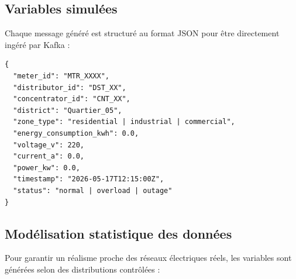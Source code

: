 \documentclass[1pt,a4paper]{report}
\begin{document}
\subsection{Variables simulées}
Chaque message généré est structuré au format JSON pour être directement ingéré par Kafka :

\begin{verbatim}
{
  "meter_id": "MTR_XXXX",
  "distributor_id": "DST_XX",
  "concentrator_id": "CNT_XX",
  "district": "Quartier_05",
  "zone_type": "residential | industrial | commercial",
  "energy_consumption_kwh": 0.0,
  "voltage_v": 220,
  "current_a": 0.0,
  "power_kw": 0.0,
  "timestamp": "2026-05-17T12:15:00Z",
  "status": "normal | overload | outage"
}
\end{verbatim}

\subsection{Modélisation statistique des données}
Pour garantir un réalisme proche des réseaux électriques réels, les variables sont générées selon des distributions contrôlées :
\end{document}
